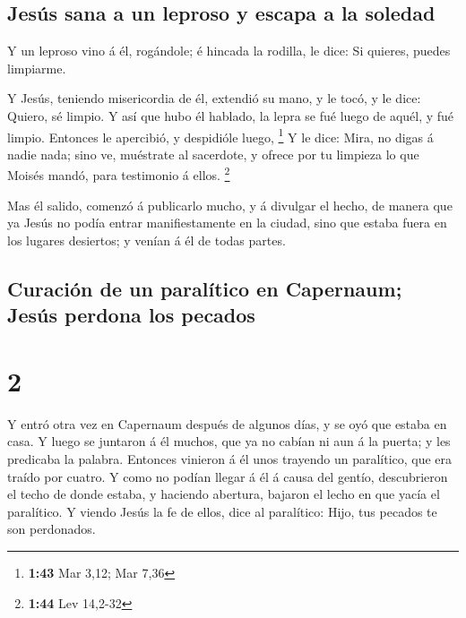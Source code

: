 \hypertarget{jesuxfas-sana-a-un-leproso-y-escapa-a-la-soledad}{%
\subsection{Jesús sana a un leproso y escapa a la
soledad}\label{jesuxfas-sana-a-un-leproso-y-escapa-a-la-soledad}}

 Y un leproso vino á él, rogándole; é hincada la rodilla,
le dice: Si quieres, puedes limpiarme.

 Y Jesús, teniendo misericordia de él, extendió su mano, y
le tocó, y le dice: Quiero, sé limpio.  Y así que hubo él
hablado, la lepra se fué luego de aquél, y fué limpio. 
Entonces le apercibió, y despidióle luego, \footnote{\textbf{1:43} Mar
  3,12; Mar 7,36}  Y le dice: Mira, no digas á nadie nada;
sino ve, muéstrate al sacerdote, y ofrece por tu limpieza lo que Moisés
mandó, para testimonio á ellos. \footnote{\textbf{1:44} Lev 14,2-32}

 Mas él salido, comenzó á publicarlo mucho, y á divulgar el
hecho, de manera que ya Jesús no podía entrar manifiestamente en la
ciudad, sino que estaba fuera en los lugares desiertos; y venían á él de
todas partes.

\hypertarget{curaciuxf3n-de-un-paraluxedtico-en-capernaum-jesuxfas-perdona-los-pecados}{%
\subsection{Curación de un paralítico en Capernaum; Jesús perdona los
pecados}\label{curaciuxf3n-de-un-paraluxedtico-en-capernaum-jesuxfas-perdona-los-pecados}}

\hypertarget{section-1}{%
\section{2}\label{section-1}}

 Y entró otra vez en Capernaum después de algunos días, y se
oyó que estaba en casa.  Y luego se juntaron á él muchos,
que ya no cabían ni aun á la puerta; y les predicaba la palabra.
 Entonces vinieron á él unos trayendo un paralítico, que era
traído por cuatro.  Y como no podían llegar á él á causa del
gentío, descubrieron el techo de donde estaba, y haciendo abertura,
bajaron el lecho en que yacía el paralítico.  Y viendo Jesús
la fe de ellos, dice al paralítico: Hijo, tus pecados te son perdonados.

